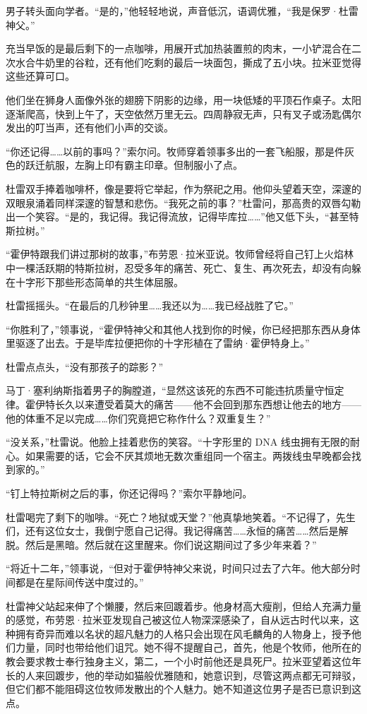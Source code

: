 \documentclass[AutoFakeBold=true]{book}
\begin{document}
男子转头面向学者。``是的，''他轻轻地说，声音低沉，语调优雅，``我是保罗·杜雷神父。''

\vspace*{1em}

充当早饭的是最后剩下的一点咖啡，用展开式加热装置煎的肉末，一小铲混合在二次水合牛奶里的谷粒，还有他们吃剩的最后一块面包，撕成了五小块。拉米亚觉得这些还算可口。

他们坐在狮身人面像外张的翅膀下阴影的边缘，用一块低矮的平顶石作桌子。太阳逐渐爬高，快到上午了，天空依然万里无云。四周静寂无声，只有叉子或汤匙偶尔发出的叮当声，还有他们小声的交谈。

``你还记得……以前的事吗？''索尔问。牧师穿着领事多出的一套飞船服，那是件灰色的跃迁航服，左胸上印有霸主印章。但制服小了点。

杜雷双手捧着咖啡杯，像是要将它举起，作为祭祀之用。他仰头望着天空，深邃的双眼泉涌着同样深邃的智慧和悲伤。``我死之前的事？''杜雷问，那高贵的双唇勾勒出一个笑容。``是的，我记得。我记得流放，记得毕库拉……''他又低下头，``甚至特斯拉树。''

``霍伊特跟我们讲过那树的故事，''布劳恩·拉米亚说。牧师曾经将自己钉上火焰林中一棵活跃期的特斯拉树，忍受{\kaishu 多年}的痛苦、死亡、复生、再次死去，却没有向躲在十字形下那些形态简单的共生体屈服。

杜雷摇摇头。``在最后的几秒钟里……我还以为……我已经战胜了它。''

``你胜利了，''领事说，``霍伊特神父和其他人找到你的时候，你已经把那东西从身体里驱逐了出去。于是毕库拉便把你的十字形植在了雷纳·霍伊特身上。''

杜雷点点头，``没有那孩子的踪影？''

马丁·塞利纳斯指着男子的胸膛道，``显然这该死的东西不可能违抗质量守恒定律。霍伊特长久以来遭受着莫大的痛苦——他不会回到那东西想让他去的地方——他的体重不足以完成……你们究竟把它称作什么？双重复生？''

``没关系，''杜雷说。他脸上挂着悲伤的笑容。``十字形里的 DNA 线虫拥有无限的耐心。如果需要的话，它会不厌其烦地无数次重组同一个宿主。两拨线虫早晚都会找到家的。''

``钉上特拉斯树之后的事，你还记得吗？''索尔平静地问。

杜雷喝完了剩下的咖啡。``死亡？地狱或天堂？''他真挚地笑着。``不记得了，先生们，还有这位女士，我倒宁愿自己记得。我记得痛苦……永恒的痛苦……然后是解脱。然后是黑暗。然后就在这里醒来。你们说这期间过了多少年来着？''

``将近十二年，''领事说，``但对于霍伊特神父来说，时间只过去了六年。他大部分时间都是在星际间传送中度过的。''

杜雷神父站起来伸了个懒腰，然后来回踱着步。他身材高大瘦削，但给人充满力量的感觉，布劳恩·拉米亚发现自己被这位人物深深感染了，自从远古时代以来，这种拥有奇异而难以名状的超凡魅力的人格只会出现在风毛麟角的人物身上，授予他们力量，同时也带给他们诅咒。她不得不提醒自己，首先，他是个牧师，他所在的教会要求教士奉行独身主义，第二，一个小时前他还是具死尸。拉米亚望着这位年长的人来回踱步，他的举动如猫般优雅随和，她意识到，尽管这两点都无可辩驳，但它们都不能阻碍这位牧师发散出的个人魅力。她不知道这位男子是否已意识到这点。
\end{document}
